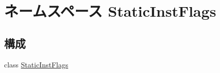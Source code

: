 \hypertarget{namespaceStaticInstFlags}{
\section{ネームスペース StaticInstFlags}
\label{namespaceStaticInstFlags}
}
\subsection*{構成}
\begin{DoxyCompactItemize}
\item 
class \hyperlink{classStaticInstFlags_1_1StaticInstFlags}{StaticInstFlags}
\end{DoxyCompactItemize}
